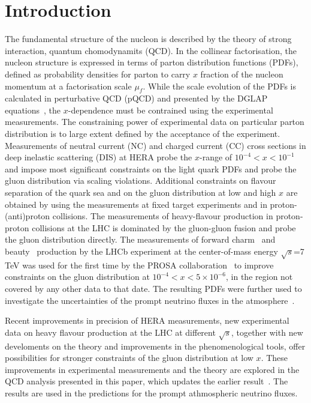 \documentclass[12pt]{article}
\begin{document}
\section{Introduction}
\label{sect:intro}

The fundamental structure of the nucleon is described by the theory of strong interaction, quantum chomodynamits (QCD).
In the collinear factorisation, the nucleon structure is expressed in terms of parton distribution functions (PDFs), defined 
as probability densities for parton to carry $x$ fraction of the nucleon momentum at a factorisation scale $\mu_f$. While the 
scale evolution of the PDFs is calculated in perturbative QCD (pQCD) and presented by the DGLAP equations~\cite{DGLAP}, the 
$x$-dependence must be contrained using the experimental measurements. The constraining power of experimental data 
on particular parton distribution is to large extent defined by the acceptance of the experiment. Measurements of 
neutral current (NC) and charged current (CC) cross sections in deep inelastic scattering (DIS) at HERA probe the $x$-range of $10^{-4}<x<10^{-1}$ and impose most significant constraints on the light quark PDFs and probe the gluon distribution via scaling violations. Additional constraints on flavour separation of the quark sea and on the gluon distribution at low and high $x$ are obtained by using the measurements at fixed target experiments and in proton-(anti)proton collisions. The measurements of heavy-flavour production in proton-proton collisions at the LHC is dominated by the gluon-gluon fusion and probe the gluon distribution directly. The measurements of forward charm~\cite{Aaij:2013mga} and beauty~\cite{Aaij:2013noa} production by the LHCb experiment at the center-of-mass energy $\sqrt{s}$=7 TeV was used for the first time by the PROSA collaboration~\cite{Zenaiev:2015rfa} to improve constraints on the gluon distribution at $10^{-4}< x < 5 \times 10^{-6}$, in the region not covered by any other data to that date. The resulting PDFs were further used to investigate the uncertainties of the prompt neutrino fluxes in the atmosphere~\cite{Garzelli:2016xmx}.       

Recent improvements in precision of HERA measurements, new experimental data on heavy flavour production at the LHC at 
different $\sqrt{s}$, together with new develoments on the theory and improvements in the phenomenological tools, offer 
possibilities for stronger constraints of the gluon distribution at low $x$. These improvements in experimental measurements 
and the theory are explored in the QCD analysis presented in this paper, which updates the earlier result~\cite{Zenaiev:2015rfa}. The results are used in the predictions for the prompt athmospheric neutrino fluxes. 
\end{document}
